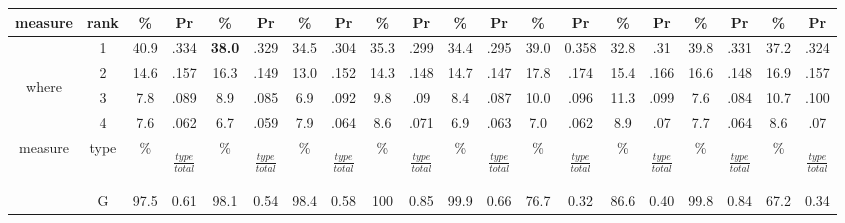 \begin{table}
\begin{center}
\begin{small}
\begin{tabular}{|cc|cc|cc|cc|cc|cc|cc|cc|cc|cc|}
\hline
measure & rank & \% & Pr & \% & Pr & \% & Pr & \% & Pr & \% & Pr& \% & Pr& \% & Pr& \% & Pr& \% & Pr  \\
\hline
 & 1 & 40.9 & .334 & \textbf{38.0} & .329 & 34.5 & .304 & 35.3 & .299 & 34.4 & .295 & 39.0 & 0.358 & 32.8 & .31 & 39.8 & .331 & 37.2 & .324 \\
\multirow{3}{3mm}{\begin{sideways}\parbox{3mm}{\begin{small}where\end{small}}\end{sideways}}
 & 2 & 14.6 & .157 & 16.3 & .149 & 13.0 & .152 & 14.3 & .148 & 14.7 & .147 & 17.8 & .174 & 15.4 & .166 & 16.6 & .148 & 16.9 & .157 \\
 & 3 & 7.8 & .089 & 8.9 & .085 & 6.9 & .092 & 9.8 & .09 & 8.4 & .087 & 10.0 & .096 & 11.3 & .099 & 7.6 & .084 & 10.7 & .100 \\
 & 4 & 7.6 & .062 & 6.7 & .059 & 7.9 & .064 & 8.6 & .071 & 6.9 & .063 & 7.0 & .062 & 8.9 & .07 & 7.7 & .064 & 8.6 & .07 \\
\hline
measure & type & \% & \begin{scriptsize}$\frac{type}{total}$\end{scriptsize} & \% & \begin{scriptsize}$\frac{type}{total}$\end{scriptsize} & \% & \begin{scriptsize}$\frac{type}{total}$\end{scriptsize} & \% & \begin{scriptsize}$\frac{type}{total}$\end{scriptsize} & \% & \begin{scriptsize}$\frac{type}{total}$\end{scriptsize} & \% & \begin{scriptsize}$\frac{type}{total}$\end{scriptsize} & \% & \begin{scriptsize}$\frac{type}{total}$\end{scriptsize} & \% & \begin{scriptsize}$\frac{type}{total}$\end{scriptsize} & \% & \begin{scriptsize}$\frac{type}{total}$\end{scriptsize} \\
\hline
 & G & 97.5 & 0.61 & 98.1 & 0.54 & 98.4 & 0.58 & 100 & 0.85 & 99.9 & 0.66 & 76.7 & 0.32 & 86.6 & 0.40 & 99.8 & 0.84 & 67.2 & 0.34 \\

\end{tabular}
\end{small}
\end{center}
\end{table}
